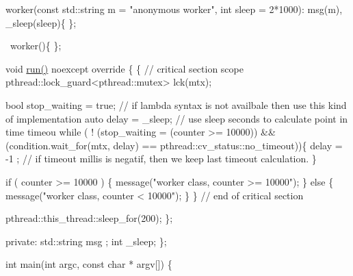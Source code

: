 \begin{DoxyPre}{\ttfamily   worker(const std::string m = "anonymous worker", int sleep = 2*1000): msg(m), \_sleep(sleep)\{
  \};}\end{DoxyPre}



\begin{DoxyPre}{\ttfamily   ~worker()\{
  \};}\end{DoxyPre}



\begin{DoxyPre}{\ttfamily   void \hyperlink{classpthread_1_1runnable_a4e0ce933602df83c096a37974ebedf84}{run()} noexcept override \{
    \{ // critical section scope
      pthread::lock\_guard<pthread::mutex> lck(mtx);}\end{DoxyPre}



\begin{DoxyPre}{\ttfamily       bool stop\_waiting = true; // if lambda syntax is not availbale then use this kind of implementation
      auto delay = \_sleep; // use sleep seconds to calculate point in time timeou
      while ( ! (stop\_waiting = (counter >= 10000)) \&\& (condition.wait\_for(mtx, delay) == pthread::cv\_status::no\_timeout))\{
        delay = -1 ; // if timeout millis is negatif, then we keep last timeout calculation.
      \}}\end{DoxyPre}



\begin{DoxyPre}{\ttfamily       if ( counter >= 10000 ) \{
        message("worker class, counter >= 10000");
      \} else \{
        message("worker class, counter < 10000");
      \}
    \} // end of critical section}\end{DoxyPre}



\begin{DoxyPre}{\ttfamily     pthread::this\_thread::sleep\_for(200);
  \};}\end{DoxyPre}



\begin{DoxyPre}{\ttfamily private:
  std::string    msg ;
  int            \_sleep;
\};}\end{DoxyPre}



\begin{DoxyPre}{\ttfamily int main(int argc, const char * argv[]) \{}\end{DoxyPre}



